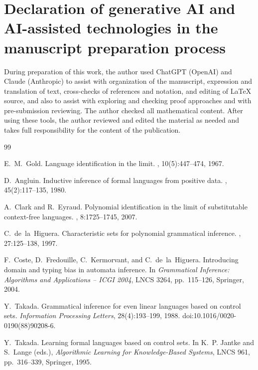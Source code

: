 \documentclass[11pt]{article}
\numberwithin{equation}{section}
\theoremstyle{plain}
\theoremstyle{definition}
\theoremstyle{remark}
\theoremstyle{plain}
\begin{document}
\section*{Declaration of generative AI and AI-assisted technologies in the manuscript preparation process}
During preparation of this work, the author used ChatGPT (OpenAI) and Claude
(Anthropic) to assist with organization of the manuscript, expression and
translation of text, cross-checks of references and notation, and editing of
\LaTeX{} source, and also to assist with exploring and checking proof
approaches and with pre-submission reviewing. The author checked all
mathematical content. After using these tools, the author reviewed and edited the
material as needed and takes full responsibility for the content of the publication.

\begin{thebibliography}{99}

E.~M.~Gold.
\newblock Language identification in the limit.
, 10(5):447--474, 1967.

D.~Angluin.
\newblock Inductive inference of formal languages from positive data.
, 45(2):117--135, 1980.

A.~Clark and R.~Eyraud.
\newblock Polynomial identification in the limit of substitutable context-free
languages.
, 8:1725--1745, 2007.

C.~de~la~Higuera.
\newblock Characteristic sets for polynomial grammatical inference.
, 27:125--138, 1997.

F.~Coste, D.~Fredouille, C.~Kermorvant, and C.~de~la~Higuera.
\newblock Introducing domain and typing bias in automata inference.
\newblock In \emph{Grammatical Inference: Algorithms and Applications -- ICGI 2004},
LNCS 3264, pp.~115--126, Springer, 2004.

Y.~Takada.
\newblock Grammatical inference for even linear languages based on control sets.
\newblock \emph{Information Processing Letters}, 28(4):193--199, 1988.
\newblock doi:10.1016/0020-0190(88)90208-6.

Y.~Takada.
\newblock Learning formal languages based on control sets.
\newblock In K.~P. Jantke and S.~Lange (eds.), \emph{Algorithmic Learning
for Knowledge-Based Systems}, LNCS 961, pp.~316--339, Springer, 1995.


\end{thebibliography}
\end{document}
